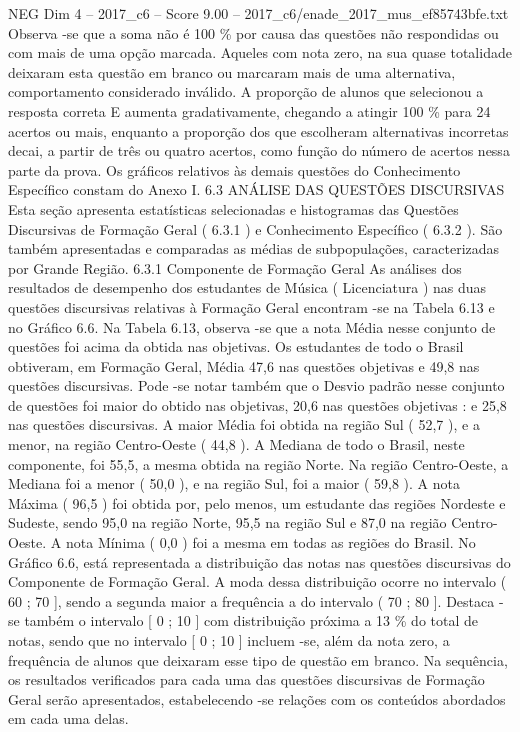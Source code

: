 \begin{textsample}{NEG Dim 4 – 2017\_c6 – Score 9.00 – 2017\_c6/enade\_2017\_mus\_ef85743bfe.txt}
Observa -se que a soma não é 100 \% por causa das questões não respondidas ou com mais de uma opção marcada.
Aqueles com nota zero, na sua quase totalidade deixaram esta questão em branco ou marcaram mais de uma alternativa, comportamento considerado inválido.
A proporção de alunos que selecionou a resposta correta E aumenta gradativamente, chegando a atingir 100 \% para 24 acertos ou mais, enquanto a proporção dos que escolheram alternativas incorretas decai, a partir de três ou quatro acertos, como função do número de acertos nessa parte da prova.
Os gráficos relativos às demais questões do Conhecimento Específico constam do Anexo I. 6.3 ANÁLISE DAS QUESTÕES DISCURSIVAS Esta seção apresenta estatísticas selecionadas e histogramas das Questões Discursivas de Formação Geral ( 6.3.1 ) e Conhecimento Específico ( 6.3.2 ).
São também apresentadas e comparadas as médias de subpopulações, caracterizadas por Grande Região. 6.3.1 Componente de Formação Geral As análises dos resultados de desempenho dos estudantes de Música ( Licenciatura ) nas duas questões discursivas relativas à Formação Geral encontram -se na Tabela 6.13 e no Gráfico 6.6.
Na Tabela 6.13, observa -se que a nota Média nesse conjunto de questões foi acima da obtida nas objetivas.
Os estudantes de todo o Brasil obtiveram, em Formação Geral, Média 47,6 nas questões objetivas e 49,8 nas questões discursivas.
Pode -se notar também que o Desvio padrão nesse conjunto de questões foi maior do obtido nas objetivas, 20,6 nas questões objetivas : e 25,8 nas questões discursivas.
A maior Média foi obtida na região Sul ( 52,7 ), e a menor, na região Centro-Oeste ( 44,8 ).
A Mediana de todo o Brasil, neste componente, foi 55,5, a mesma obtida na região Norte.
Na região Centro-Oeste, a Mediana foi a menor ( 50,0 ), e na região Sul, foi a maior ( 59,8 ).
A nota Máxima ( 96,5 ) foi obtida por, pelo menos, um estudante das regiões Nordeste e Sudeste, sendo 95,0 na região Norte, 95,5 na região Sul e 87,0 na região Centro-Oeste.
A nota Mínima ( 0,0 ) foi a mesma em todas as regiões do Brasil.
No Gráfico 6.6, está representada a distribuição das notas nas questões discursivas do Componente de Formação Geral.
A moda dessa distribuição ocorre no intervalo ( 60 ; 70 ], sendo a segunda maior a frequência a do intervalo ( 70 ; 80 ].
Destaca -se também o intervalo [ 0 ; 10 ] com distribuição próxima a 13 \% do total de notas, sendo que no intervalo [ 0 ; 10 ] incluem -se, além da nota zero, a frequência de alunos que deixaram esse tipo de questão em branco.
Na sequência, os resultados verificados para cada uma das questões discursivas de Formação Geral serão apresentados, estabelecendo -se relações com os conteúdos abordados em cada uma delas.

\end{textsample}
